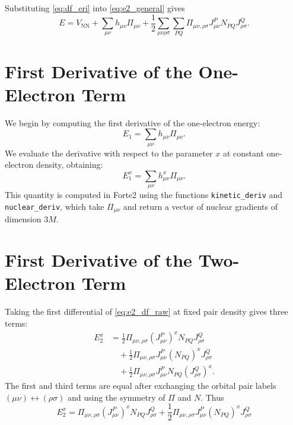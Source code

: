 \documentclass[aip,preprint]{revtex4-1}
\newcommand{\pert}{x}
\begin{document}
Substituting \cref{eq:df_eri} into \cref{eq:e2_general} gives
\begin{equation}
E
=  V_\mathrm{NN} +
\sum_{\mu \nu} h_{\mu\nu} \Pi_{\mu \nu}
+ \frac{1}{2}
\sum_{\mu \nu \rho \sigma} \sum_{PQ} \Pi_{\mu\nu,\rho\sigma}
J^P_{\mu\nu} N_{PQ} J^Q_{\rho\sigma}.
\label{eq:e2_df_raw}
\end{equation}

\section{First Derivative of the One-Electron Term}
We begin by computing the first derivative of the one-electron energy:
\begin{equation}
E_1 = \sum_{\mu \nu} h_{\mu\nu} \Pi_{\mu \nu}.
\end{equation}
We evaluate the derivative with respect to the parameter $x$ at constant one-electron density, obtaining:
\begin{equation}
E_1^{\pert} = \sum_{\mu \nu} h_{\mu\nu}^{\pert} \Pi_{\mu \nu}.
\end{equation}
This quantity is computed in Forte2 using the functions \texttt{kinetic\_deriv} and \texttt{nuclear\_deriv}, which take $\Pi_{\mu \nu}$ and return a vector of nuclear gradients of dimension $3M$.

\section{First Derivative of the Two-Electron Term}

Taking the first differential of \cref{eq:e2_df_raw} at fixed pair density gives three terms:
\begin{align}
E_2^{\pert}
&=
\frac{1}{2}
\Pi_{\mu\nu,\rho\sigma}
(J^P_{\mu\nu})^{\pert} N_{PQ} J^Q_{\rho\sigma}
\nonumber\\
&\quad+
\frac{1}{2}
\Pi_{\mu\nu,\rho\sigma}
J^P_{\mu\nu} (N_{PQ})^{\pert} J^Q_{\rho\sigma}
\nonumber\\
&\quad+
\frac{1}{2}
\Pi_{\mu\nu,\rho\sigma}
J^P_{\mu\nu} N_{PQ} (J^Q_{\rho\sigma})^{\pert}.
\label{eq:de2_three_terms}
\end{align}
The first and third terms are equal after exchanging the orbital pair labels
$(\mu\nu) \leftrightarrow (\rho\sigma)$ and using the symmetry of $\Pi$ and
$N$.  Thus
\begin{equation}
E_2^{\pert}
=
\Pi_{\mu\nu,\rho\sigma}
(J^P_{\mu\nu})^{\pert} N_{PQ} J^Q_{\rho\sigma}
+
\frac{1}{2}
\Pi_{\mu\nu,\rho\sigma}
J^P_{\mu\nu} (N_{PQ})^{\pert} J^Q_{\rho\sigma}
\label{eq:de2_after_pair_sym}
\end{equation}
\end{document}

